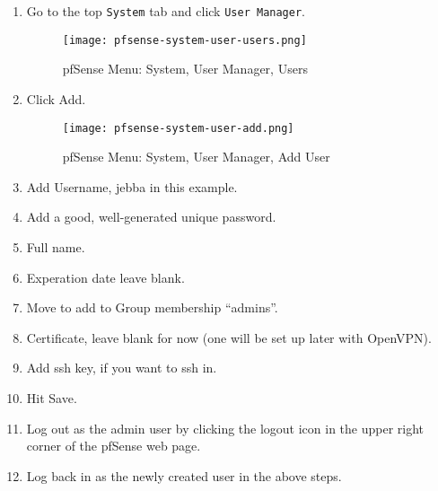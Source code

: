 \begin{enumerate}
 \item Go to the top \texttt{System} tab and click \texttt{User Manager}.
\begin{figure}[h!]
\begin{center}
\texttt{[image: pfsense-system-user-users.png]}
 \caption{pfSense Menu: System, User Manager, Users}
 \label{fig:pfsense-system-user-users}
\end{center}
\end{figure}
 \item Click Add.

\begin{figure}[h!]
\begin{center}
\texttt{[image: pfsense-system-user-add.png]}
 \caption{pfSense Menu: System, User Manager, Add User}
 \label{fig:pfsense-system-user-add}
\end{center}
\end{figure}

 \item Add Username, jebba in this example.
 \item Add a good, well-generated unique password.
 \item Full name.
 \item Experation date leave blank.
 \item Move to add to Group membership ``admins''.
 \item Certificate, leave blank for now (one will be set up later with OpenVPN).
 \item Add ssh key, if you want to ssh in.
 \item Hit Save.
 \item Log out as the admin user by clicking the logout icon in the upper right corner of the pfSense web page.
 \item Log back in as the newly created user in the above steps.


\end{enumerate}
